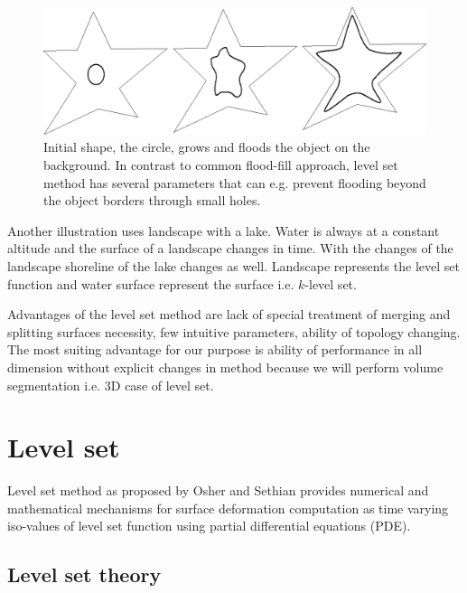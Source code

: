 \begin{enumerate}
\begin{figure}
    \centering
    \includegraphics[width=12cm]{data/flooding}
    \caption[Flooding an object]{Initial shape, the circle, grows and floods the object on the background.
In contrast to common flood-fill approach, level set method has several parameters that can e.g. prevent flooding beyond the object borders through small holes.}
    \label{fg:flooding}
\end{figure}

\par
Another illustration uses landscape with a lake.
Water is always at a constant altitude and the surface of a landscape changes in time.
With the changes of the landscape shoreline of the lake changes as well.
Landscape represents the level set function and water surface represent the surface i.e. $k$-level set.

\par
Advantages of the level set method are lack of special treatment of merging and splitting surfaces necessity, few intuitive parameters, ability of topology changing.
The most suiting advantage for our purpose is ability of performance in all dimension without explicit changes in method because we will perform volume segmentation i.e. 3D case of level set.

\end{enumerate}

\section{Level set}

Level set method as proposed by Osher and Sethian \cite{sethianLS} provides numerical and mathematical mechanisms for surface deformation computation as time varying iso-values of level set function using partial differential equations (PDE).

\subsection{Level set theory}

